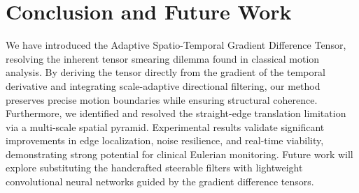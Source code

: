 \documentclass[preprint,12pt]{elsarticle}
\begin{document}
\section{Conclusion and Future Work}
\label{sec:conclusion}
We have introduced the Adaptive Spatio-Temporal Gradient Difference Tensor, resolving the inherent tensor smearing dilemma found in classical motion analysis. By deriving the tensor directly from the gradient of the temporal derivative and integrating scale-adaptive directional filtering, our method preserves precise motion boundaries while ensuring structural coherence. Furthermore, we identified and resolved the straight-edge translation limitation via a multi-scale spatial pyramid. Experimental results validate significant improvements in edge localization, noise resilience, and real-time viability, demonstrating strong potential for clinical Eulerian monitoring. Future work will explore substituting the handcrafted steerable filters with lightweight convolutional neural networks guided by the gradient difference tensors.



\end{document}
